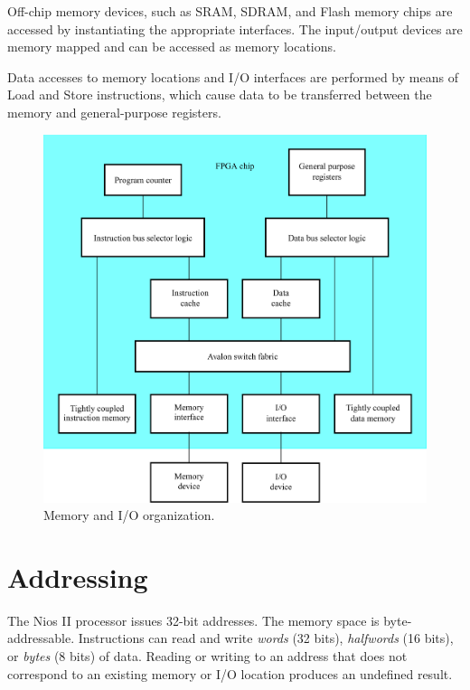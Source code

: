 \documentclass[11pt, twoside, pdftex]{article}
\begin{document}
Off-chip memory devices, such as SRAM, SDRAM, and Flash memory chips are accessed
by instantiating the appropriate interfaces. The input/output devices are 
memory mapped and can be accessed as memory locations.

Data accesses to memory locations and I/O interfaces are performed by means of
Load and Store instructions, which cause data to be transferred between the memory 
and general-purpose registers.
 
\begin{figure}[H]
   \begin{center}
      \includegraphics[scale=0.83]{figures/figure4.png}
   \caption{Memory and I/O organization.} 
	 \label{fig:4}
	 \end{center}
\end{figure}

\section{Addressing}
The Nios II processor issues 32-bit addresses. The memory space is byte-addressable.
Instructions can read and write {\it words} (32 bits), {\it halfwords} (16 bits),
or {\it bytes} (8 bits) of data. Reading or writing to an address that does not
correspond to an existing memory or I/O location produces an undefined result.
\end{document}
